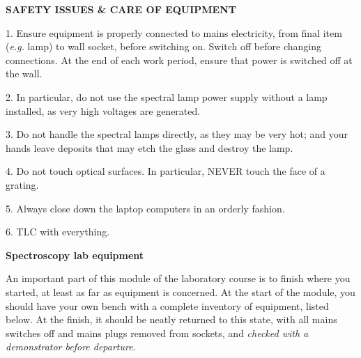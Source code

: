 \documentclass[12pt]{article}
\begin{document}
{\begin{center}\bf SAFETY  ISSUES \& CARE OF EQUIPMENT\end{center}}

1. Ensure equipment is properly connected to mains electricity, from final 
item ({\sl e.g.} lamp) to wall socket, before switching on. Switch off
before changing connections. At the end of each work period, ensure that 
power is switched off at the wall.

2. In particular, do not use the spectral lamp power supply without a lamp 
installed, as very high voltages are generated.

3. Do not handle the spectral lamps directly, as they may be very hot; and your
hands leave deposits that may etch the glass and destroy the lamp.

4. Do not touch optical surfaces. In particular, NEVER touch the face of
a grating.

5. Always close down the laptop computers in an orderly fashion.

6. TLC with everything.
\newpage

{\large\bf Spectroscopy lab equipment}

An important part of this module of the laboratory course is to
finish where you started, at least as far as equipment is concerned.
At the start of the module, you should have your own bench with
a complete inventory of equipment, listed below. At the finish, it should
be neatly returned to this state, with all mains switches off and mains
plugs removed from sockets, and {\sl checked with a demonstrator before 
departure}. 
\end{document}
